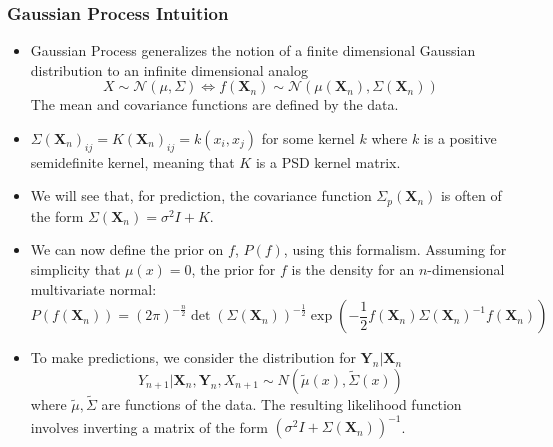\documentclass{beamer}
\begin{document}

\begin{frame}
\frametitle{Gaussian Process Intuition}
\begin{itemize}
\item Gaussian Process generalizes the notion of a finite dimensional Gaussian distribution to an infinite dimensional analog
$$X \sim \mathcal{N}(\mu, \Sigma) \Longleftrightarrow f(\textbf{X}_n) \sim \mathcal{N}(\mu(\textbf{X}_n), \Sigma(\textbf{X}_n))$$
The mean and covariance functions are defined by the data.

\item $\Sigma(\textbf{X}_n)_{ij} = K(\textbf{X}_n)_{ij} = k(x_i,x_j)$ for some kernel $k$ where $k$ is a positive semidefinite kernel, meaning that $K$ is a PSD kernel matrix.
\item We will see that, for prediction, the covariance function $\Sigma_p(\textbf{X}_n)$ is often of the form $\Sigma(\textbf{X}_n) = \sigma^2 I + K$.
\end{itemize}
\end{frame}

\begin{frame}
\begin{itemize}
\item We can now define the prior on $f$, $P(f)$, using this formalism. Assuming for simplicity that $\mu(x) = 0$, the prior for $f$ is the density for an $n$-dimensional multivariate normal:
$$P(f(\textbf{X}_n)) = (2\pi)^{-\frac{n}{2}} \det( \Sigma(\textbf{X}_n))^{-\frac{1}{2}} \exp \left(-\frac{1}{2} f(\textbf{X}_n)\Sigma(\textbf{X}_n)^{-1} f(\textbf{X}_n) \right)$$
\item To make predictions, we consider the distribution for $\textbf{Y}_n | \textbf{X}_n$
$$Y_{n+1} | \textbf{X}_n, \textbf{Y}_n, X_{n+1} \sim N(\tilde{\mu}(x), \tilde{\Sigma}(x))$$
where $\tilde{\mu}, \tilde{\Sigma}$ are functions of the data. The resulting likelihood function involves inverting a matrix of the form $(\sigma^2 I + \Sigma(\textbf{X}_n))^{-1}$.

\end{itemize}
\end{frame}

\end{document}
